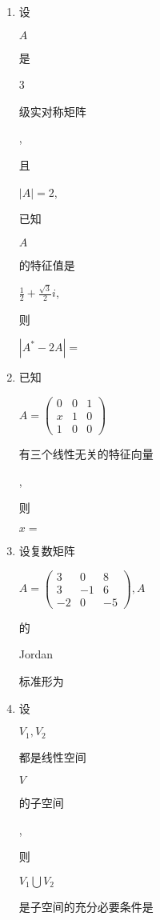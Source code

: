 \documentclass[10pt]{article}
\begin{document}
\begin{enumerate}
  \item \begin{CJK}{UTF8}{mj}设\end{CJK} $A$ \begin{CJK}{UTF8}{mj}是\end{CJK} 3 \begin{CJK}{UTF8}{mj}级实对称矩阵\end{CJK}, \begin{CJK}{UTF8}{mj}且\end{CJK} $|A|=2$, \begin{CJK}{UTF8}{mj}已知\end{CJK} $A$ \begin{CJK}{UTF8}{mj}的特征值是\end{CJK} $\frac{1}{2}+\frac{\sqrt{3}}{2} i$, \begin{CJK}{UTF8}{mj}则\end{CJK} $\left|A^{*}-2 A\right|=$

  \item \begin{CJK}{UTF8}{mj}已知\end{CJK} $A=\left(\begin{array}{lll}0 & 0 & 1 \\ x & 1 & 0 \\ 1 & 0 & 0\end{array}\right)$ \begin{CJK}{UTF8}{mj}有三个线性无关的特征向量\end{CJK}, \begin{CJK}{UTF8}{mj}则\end{CJK} $x=$

  \item \begin{CJK}{UTF8}{mj}设复数矩阵\end{CJK} $A=\left(\begin{array}{ccc}3 & 0 & 8 \\ 3 & -1 & 6 \\ -2 & 0 & -5\end{array}\right), A$ \begin{CJK}{UTF8}{mj}的\end{CJK} Jordan \begin{CJK}{UTF8}{mj}标准形为\end{CJK}

  \item \begin{CJK}{UTF8}{mj}设\end{CJK} $V_{1}, V_{2}$ \begin{CJK}{UTF8}{mj}都是线性空间\end{CJK} $V$ \begin{CJK}{UTF8}{mj}的子空间\end{CJK}, \begin{CJK}{UTF8}{mj}则\end{CJK} $V_{1} \bigcup V_{2}$ \begin{CJK}{UTF8}{mj}是子空间的充分必要条件是\end{CJK}


\end{enumerate}
\end{document}
